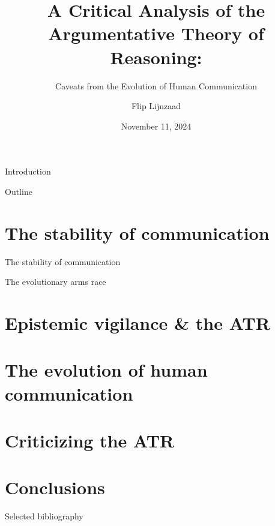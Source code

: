 \documentclass[xcolor=table]{beamer}       %
\title{A Critical Analysis of the Argumentative Theory of Reasoning:}
\subtitle{Caveats from the Evolution of Human Communication}
\author{Flip Lijnzaad}
\date{November 11, 2024}
\begin{document}
\maketitle

\begin{frame}{Introduction}
    
\end{frame}

\begin{frame}{Outline}
    \tableofcontents
\end{frame}

\section{The stability of communication}

\begin{frame}{The stability of communication}
    
\end{frame}

\begin{frame}{The evolutionary arms race}
    
\end{frame}

\section{Epistemic vigilance \& the ATR}

\begin{frame}{\insertsection}
    
\end{frame}

\section{The evolution of human communication}

\begin{frame}{\insertsection}
    
\end{frame}

\section{Criticizing the ATR}

\begin{frame}{\insertsection}
    
\end{frame}

\section{Conclusions}

\begin{frame}{\insertsection}
    
\end{frame}

\begin{frame}{Selected bibliography}
    \nocite{Tomasello09}
    \printbibliography
\end{frame}
\end{document}
